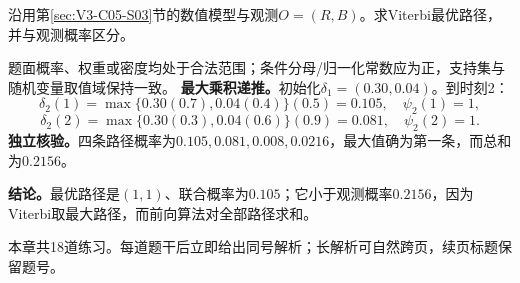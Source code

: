 \label{struct:V3-C05-CH32}
\begin{example}[两状态HMM的Viterbi路径]\label{exm:V3-C05-viterbi-path-rb}
沿用第\ref{sec:V3-C05-S03}节的数值模型与观测$O=(R,B)$。求Viterbi最优路径，并与观测概率区分。

\label{struct:V3-C05-CH33}
\end{example}
\begin{solution}
\SolGiven 题面概率、权重或密度均处于合法范围；条件分母/归一化常数应为正，支持集与随机变量取值域保持一致。
\SolDerive
\textbf{最大乘积递推。}初始化$\delta_1=(0.30,0.04)$。到时刻2：
\[
\delta_2(1)=\max\{0.30(0.7),0.04(0.4)\}(0.5)=0.105,
\quad\psi_2(1)=1,
\]
\[
\delta_2(2)=\max\{0.30(0.3),0.04(0.6)\}(0.9)=0.081,
\quad\psi_2(2)=1.
\]
\textbf{独立核验。}四条路径概率为$0.105,0.081,0.008,0.0216$，最大值确为第一条，而总和为$0.2156$。

\textbf{结论。}最优路径是$(1,1)$、联合概率为$0.105$；它小于观测概率$0.2156$，因为Viterbi取最大路径，而前向算法对全部路径求和。
\end{solution}


\label{struct:V3-C05-CH34}
\begingroup
\begin{chapterexercisebox}
\label{struct:V3-C05-CH35}
本章共18道练习。每道题干后立即给出同号解析；长解析可自然跨页，续页标题保留题号。
\end{chapterexercisebox}

